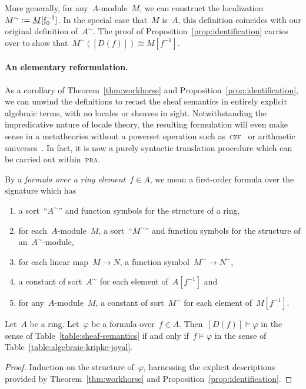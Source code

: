 \documentclass{ws-rv9x6}
\newcommand{\fff}{\mathfrak{f}}
\newcommand{\defeq}{\vcentcolon=}
\renewcommand{\_}{\mathpunct{.}}
\newcommand{\?}{\,{:}\,}
\begin{document}
More generally, for any~$A$-module~$M$, we can construct the
localization~$M^\sim \defeq \underline{M}[\fff_0^{-1}]$. In the special case
that~$M$ is~$A$, this definition coincides with our original definition
of~$A^\sim$. The proof of Proposition~\ref{prop:identification} carries over to
show that~$M^\sim([D(f)]) \cong M[f^{-1}]$.

\paragraph{An elementary reformulation.}
As a corollary of Theorem~\ref{thm:workhorse} and
Proposition~\ref{prop:identification}, we can unwind the definitions to recast
the sheaf semantics in entirely explicit algebraic terms, with no locales or
sheaves in sight. Notwithstanding the impredicative nature of locale theory,
the resulting formulation will even make sense in a metatheories without a
powerset operation such as~\textsc{czf}~\cite{crosilla:predicativity,aczel-rathjen:cst} or arithmetic
universes~\cite{maietti:au,vickers:sketches}. In
fact, it is now a purely syntactic translation procedure which can be carried
out within~\textsc{pra}.

By a \emph{formula over a ring element}~$f \in A$, we mean a
first-order formula over the signature which has
\begin{enumerate}
\item a sort~``$A^\sim$'' and function symbols for the structure of a ring,
\item for each~$A$-module~$M$, a sort~``$M^\sim$'' and function symbols for the
structure of an~$A^\sim$-module,
\item for each linear map~$M \to N$, a function symbol~$M^\sim \to N^\sim$,
\item a constant of sort~$A^\sim$ for each element of~$A[f^{-1}]$ and
\item for any~$A$-module~$M$, a constant of sort~$M^\sim$ for each element of~$M[f^{-1}]$.
\end{enumerate}

\begin{corollary}\label{cor:algebraic-reformulation}
Let~$A$ be a ring. Let~$\varphi$ be a formula over~$f \in A$.
Then~$[D(f)] \models \varphi$ in the sense of Table~\ref{table:sheaf-semantics} if and only
if~$f \models \varphi$ in the sense of Table~\ref{table:algebraic-kripke-joyal}.
\end{corollary}

\begin{proof}Induction on the structure of~$\varphi$, harnessing the explicit
descriptions provided by Theorem~\ref{thm:workhorse} and
Proposition~\ref{prop:identification}.\end{proof}
\end{document}
